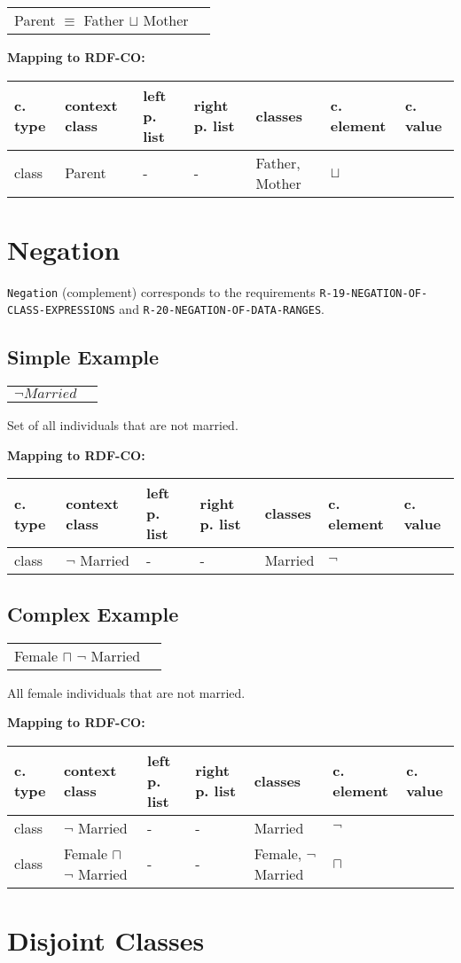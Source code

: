 \documentclass{llncs}
\newcommand{\ms}[1]{\texttt{#1}}
\newenvironment{gcotable}{
  \scriptsize
  \sffamily
  \vspace{0cm}
	\begin{center}
	\textbf{\vspace{0.4cm}Mapping to RDF-CO:} \\
  \begin{tabular}{l|l|l|l|l|l|l}
	\hline
  \textbf{c. type} & \textbf{context class} & \textbf{left p. list} & \textbf{right p. list} & \textbf{classes} & \textbf{c. element} & \textbf{c. value} \\
  \hline

}{
  \hline
  \end{tabular}
	\end{center}
}
\newenvironment{DL}{
  \vspace{0cm}
	\begin{center}
  \begin{tabular}{r l}

}{
  \end{tabular}
	\end{center}
}
\begin{document}
\begin{DL}
Parent $\equiv$ Father $\sqcup$ Mother
\end{DL}

\begin{gcotable}
class & Parent & - & - & Father, Mother & $\sqcup$ \\
\end{gcotable}

\section{Negation}

\ms{Negation} (complement) corresponds to the requirements \ms{R-19-NEGATION-OF-CLASS-EXPRESSIONS} and \ms{R-20-NEGATION-OF-DATA-RANGES}.

\subsection{Simple Example}

\begin{DL}
$ \neg Married $ \\ 
\end{DL}

Set of all individuals that are not married.

\begin{gcotable}
class & $\neg$ Married & - & - & Married & $\neg$ \\
\end{gcotable}

\subsection{Complex Example}

\begin{DL}
Female $\sqcap$ $\neg$ Married \\
\end{DL}

All female individuals that are not married.

\begin{gcotable}
class & $\neg$ Married & - & - & Married & $\neg$ \\
class & Female $\sqcap$ $\neg$ Married & - & - & Female, $\neg$ Married & $\sqcap$ \\
\end{gcotable}

\section{Disjoint Classes}
\end{document}
